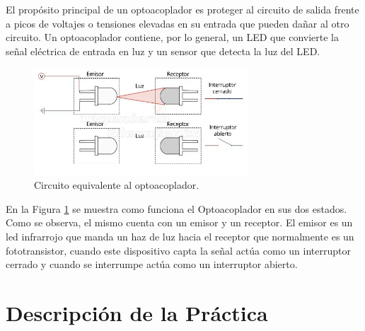 ﻿\documentclass[a4paper]{article}
\begin{document}
El propósito principal de un optoacoplador es proteger al circuito 
de salida frente a picos de voltajes o tensiones elevadas en su 
entrada que pueden dañar al otro circuito. Un optoacoplador 
contiene, por lo general, un LED que convierte la señal eléctrica 
de entrada en luz y un sensor que detecta la luz del LED.

\begin{figure}[h]\centering
    \includegraphics[height=4cm]{Optoacoplador.png}
    \caption{Circuito equivalente al optoacoplador.}
    \label{fig:Optoacoplador}
\end{figure}

En la Figura \ref{fig:Optoacoplador} se muestra como funciona el 
Optoacoplador en sus dos estados. Como se observa, el mismo 
cuenta con un emisor y un receptor. El emisor es 
un led infrarrojo que manda un haz de luz hacia el receptor que 
normalmente es un fototransistor, cuando este dispositivo capta 
la señal actúa como un interruptor cerrado y cuando se interrumpe 
actúa como un interruptor abierto.

\section{Descripción de la Práctica}
\end{document}
